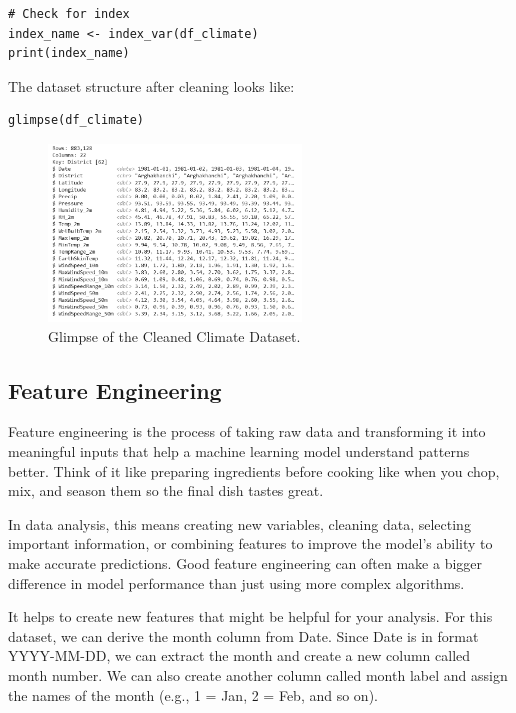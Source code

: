 \begin{enumerate}
\begin{verbatim}
# Check for index
index_name <- index_var(df_climate)
print(index_name)
\end{verbatim}

The dataset structure after cleaning looks like:

\begin{verbatim}
glimpse(df_climate)
\end{verbatim}

\begin{figure}[h!]
    \centering
    \includegraphics[width=0.6\textwidth]{figures/glimpse.png}
    \caption{Glimpse of the Cleaned Climate Dataset.}
\end{figure}

\end{enumerate}
\subsection{Feature Engineering}

Feature engineering is the process of taking raw data and transforming it into meaningful inputs that help a machine learning model understand patterns better. Think of it like preparing ingredients before cooking like when you chop, mix, and season them so the final dish tastes great.

In data analysis, this means creating new variables, cleaning data, selecting important information, or combining features to improve the model’s ability to make accurate predictions. Good feature engineering can often make a bigger difference in model performance than just using more complex algorithms.

It helps to create new features that might be helpful for your analysis. For this dataset, we can derive the month column from Date. Since Date is in format YYYY-MM-DD, we can extract the month and create a new column called month number. We can also create another column called month label and assign the names of the month (e.g., 1 = Jan, 2 = Feb, and so on).


